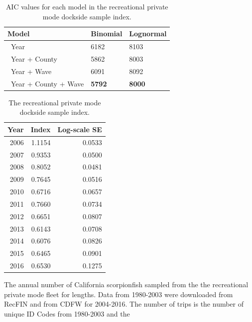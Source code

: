 \documentclass[12pt,]{article}
\begin{document}
\begin{table}[ht]
\centering
\caption{AIC values for each model in the
                                          recreational private mode dockside sample 
                                          index.} 
\label{tab:Fleet4_RecPR_dockside_aic}
\begin{tabular}{lll}
  \hline
Model & Binomial & Lognormal \\ 
  \hline
~Year & 6182 & 8103 \\ 
  ~Year + County & 5862 & 8003 \\ 
  ~Year + Wave & 6091 & 8092 \\ 
  ~Year + County + Wave & \textbf{5792} & \textbf{8000} \\ 
   \hline
\end{tabular}
\end{table}\begin{table}[ht]
\centering
\caption{The recreational private mode 
                                            dockside sample index.} 
\label{tab:Fleet4_RecPR_dockside_index}
\begin{tabular}{rrr}
  \hline
Year & Index & Log-scale SE \\ 
  \hline
 2006 & 1.1154 & 0.0533 \\ 
   2007 & 0.9353 & 0.0500 \\ 
   2008 & 0.8052 & 0.0481 \\ 
   2009 & 0.7645 & 0.0516 \\ 
   2010 & 0.6716 & 0.0657 \\ 
   2011 & 0.7660 & 0.0734 \\ 
   2012 & 0.6651 & 0.0807 \\ 
   2013 & 0.6143 & 0.0708 \\ 
   2014 & 0.6076 & 0.0826 \\ 
   2015 & 0.6465 & 0.0901 \\ 
   2016 & 0.6530 & 0.1275 \\ 
   \hline
\end{tabular}
\end{table}\begin{table}[ht]
\centering
\caption{The annual number of California scorpionfish 
                                              sampled from the the recreational private 
                                              mode fleet for lengths. Data from 1980-2003
                                            were downloaded from RecFIN and from CDFW for
                                            2004-2016. The number of trips is the number
                                            of unique ID Codes from 1980-2003 and the 
}
\end{table}
\end{document}
